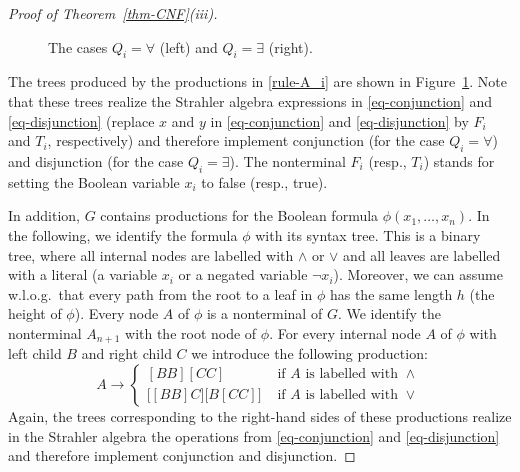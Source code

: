 \documentclass[a4paper,UKenglish,cleveref, autoref, thm-restate, numberwithinsect]{lipics-v2021}
\begin{document}
\begin{proof}[Proof of Theorem~\ref{thm-CNF}(iii)]
\begin{figure}[t]
{}
\caption{The cases $Q_i = \forall$ (left) and $Q_i = \exists$ (right).} \label{fig-exists}
\end{figure}
The trees produced by the productions in \eqref{rule-A_i} are shown in Figure~\ref{fig-exists}.
Note that these trees realize the Strahler algebra expressions in \eqref{eq-conjunction} and \eqref{eq-disjunction}
(replace $x$ and $y$ in \eqref{eq-conjunction} and \eqref{eq-disjunction} by $F_i$ and $T_i$, respectively)
and therefore  implement conjunction (for the case $Q_i = \forall$) and disjunction (for the case $Q_i = \exists$).
The nonterminal $F_i$ (resp., $T_i$) stands for setting the Boolean variable $x_i$ to false (resp., true).

In addition, $G$ contains productions for the Boolean formula $\phi(x_1, \ldots, x_n)$. 
In the following, we identify the formula $\phi$ with its syntax tree. This is a binary tree, where all internal nodes are labelled 
with $\wedge$ or $\vee$ and all leaves are labelled with a literal (a variable $x_i$ or a negated variable $\neg x_i$).
Moreover, we can assume w.l.o.g.~that every path from the root to a leaf in $\phi$ has the same length $h$ (the height of $\phi$).  
Every node $A$ of $\phi$ is a nonterminal of $G$.
We identify the nonterminal $A_{n+1}$ with the root node of $\phi$.
For every internal node $A$ of $\phi$ with left child $B$ and right child  $C$ we introduce the following production:
\[ A  \to 
\begin{cases}
[BB] [CC]                                                      & \text{ if $A$ is labelled with $\wedge$}  \\[1mm]
\big[ [BB] C \big] \big[ B [CC] \big]  & \text{ if $A$ is labelled with $\vee$} 
\end{cases} 
\]
Again, the trees corresponding to the right-hand sides of these productions realize in the Strahler algebra the operations
from  \eqref{eq-conjunction} and \eqref{eq-disjunction} and therefore implement conjunction and disjunction.


\end{proof}
\end{document}

